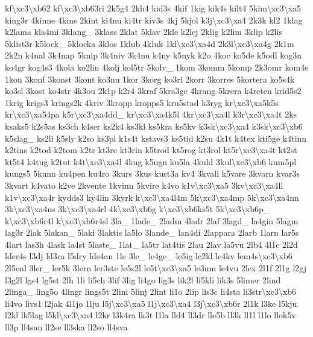{kf\textbackslash{}xc3\textbackslash{}xb62 kf\textbackslash{}xc3\textbackslash{}xb63ri 2k5g4 2kh4 kid3s 4kif 1kig kik4s kilt4 5kim\textbackslash{}xc3\textbackslash{}xa5 king3r 4kinne 4kins 2kint ki4nu ki4tr kiv3s 4kj 5kjol k3j\textbackslash{}xc3\textbackslash{}xa4 2k3k kl2 1klag k2lama kla4mi 3klang\-\_\- 3klass 2klat 5klav 2kle k2lej 2klig k2lim 3klip k2lis 5klist3r k5lock\-\_\- 5klocka 3klos 1klub 4kluk 1kl\textbackslash{}xc3\textbackslash{}xa4d 2k3l\textbackslash{}xc3\textbackslash{}xa4g 2k1m 2k2n k4nal 3k4nap 5knip 3k4niv 3k4nu k4ny k5nyk k2o 4koc ko5de k5odl kog3n ko4gr kog4s3 4kola ko2lin 4kolj kol5tr 5kolv\-\_\- 1kom 3komm 5komp 2k3omr kom4s 1kon 3konf 3konst 3kont ko3nu 1kor 3korg ko3ri 2korr 3korres 5kortera ko5s4k ko3sl 3kost ko4str 4k3ou 2k1p k2r4 3kraf 5kra3ge 4krang 5krera k4reten krid5s2 1krig krigs3 krings2k 4kriv 3kropp kropps5 kru5stad k3ryg kr\textbackslash{}xc3\textbackslash{}xa5k5s kr\textbackslash{}xc3\textbackslash{}xa54pa k5r\textbackslash{}xc3\textbackslash{}xa4dd\-\_\- kr\textbackslash{}xc3\textbackslash{}xa4k5l 4kr\textbackslash{}xc3\textbackslash{}xa4l k3r\textbackslash{}xc3\textbackslash{}xa4t 2ks ksaks5 k2s5as ks3ch k4ser ks2k4 ks3kl ks5kra ks5kv k3sk\textbackslash{}xc3\textbackslash{}xa4 k3sk\textbackslash{}xc3\textbackslash{}xb6 k5slag\-\_\- ks2li k5sly k2so ks3pl k1s4t kstavs3 ks5tid k2su 4k1t k4tex kti5ge k4tinn k2tins k2tod k2tom k2tr kt3re kt3rin k5trod kt5rog kt3rol kt5r\textbackslash{}xc3\textbackslash{}xa4t kt2st kt5t4 k4tug k2tut k4t\textbackslash{}xc3\textbackslash{}xa4l 4kug k5ugn ku5la 4kuld 3kul\textbackslash{}xc3\textbackslash{}xb6 kum5pl kungs5 5kunn ku4pen ku4ro 3kurs 3kus kust3a kv4 3kvali k5vare 3kvarn kvar3s 3kvart k4vato k2ve 2kvente 1kvinn 5kvire k4vo k1v\textbackslash{}xc3\textbackslash{}xa5 3kv\textbackslash{}xc3\textbackslash{}xa4ll k1v\textbackslash{}xc3\textbackslash{}xa4r kydds3 ky4lin 3kyrk k\textbackslash{}xc3\textbackslash{}xa4l4m 5k\textbackslash{}xc3\textbackslash{}xa4mp 5k\textbackslash{}xc3\textbackslash{}xa4nn 3k\textbackslash{}xc3\textbackslash{}xa4ns 3k\textbackslash{}xc3\textbackslash{}xa4rl 4k\textbackslash{}xc3\textbackslash{}xb6g k\textbackslash{}xc3\textbackslash{}xb6ks5t 5k\textbackslash{}xc3\textbackslash{}xb6p\-\_\- k\textbackslash{}xc3\textbackslash{}xb6r4l k\textbackslash{}xc3\textbackslash{}xb6r4sl 3la\-\_\- 1lade\-\_\- 2ladm 4ladr 2laf 3lagd\-\_\- la4gin 5lagm lag3r 2lak 5lakan\-\_\- 5laki 3laktis la5lo 3lande\-\_\- lan4di 2lappara 2larb 1larn lar5s 4lart las3h 4lask la4st 5laste\-\_\- 1lat\-\_\- la5tr lat4tis 2lau 2lav la5vu 2lb4 4l1c 2l2d lder4s l3dj ld3ra l5dry lds4an 1le 3le\-\_\- le4ge\-\_\- le5ig le2kl le4kv lem4s\textbackslash{}xc3\textbackslash{}xb6 2l5enl 3ler\-\_\- ler5k 3lern ler3ste le5s2l le5t\textbackslash{}xc3\textbackslash{}xa5 le3um le4vu 2lex 2l1f 2l1g l2gj l3g2l lgs4 lg5st 2lh 1li li5ch 3lif 3lig li4go lig3s lik2l li5kli lik3s 5limer 2lind 2linga\-\_\- ling5o 4lingr lings5t 2lini 5linj 2lint li1o 2lip lis3c li4sta li3str\textbackslash{}xc3\textbackslash{}xb6 li4vo livs1 l2jak 4l1jo 1lju l5j\textbackslash{}xc3\textbackslash{}xa5 l1j\textbackslash{}xc3\textbackslash{}xa4 l3j\textbackslash{}xc3\textbackslash{}xb6r 2l1k l3ke l5kju l2kl lk5lag l5kl\textbackslash{}xc3\textbackslash{}xa4 l2kr l3k4ra lk3t l1la lld4 ll3dr lle5b ll3k ll1l l1lo llok5v ll3p ll4san ll2se ll3ska ll2so ll4sva }
